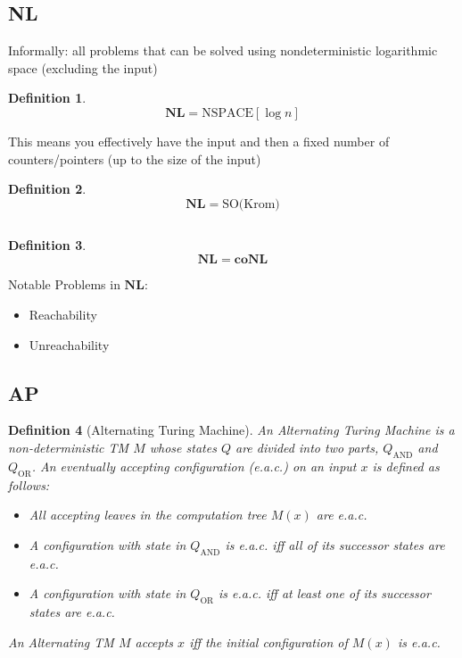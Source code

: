 \documentclass[]{article}
\theoremstyle{break}
\theoremstyle{break}
\newtheorem{definition}{Definition}[section]
\begin{document}
\subsection{NL}
\label{sec:NL}
Informally: all problems that can be solved using nondeterministic logarithmic space (excluding the input)
\\
\begin{definition}
	$$\mathbf{NL} = \hyperref[sec:NSPACE]{\text{NSPACE}[\log n]}$$
\end{definition}
$ $
\\
This means you effectively have the input and then a fixed number of counters/pointers (up to the size of the input)
\\
\begin{definition}
	$$\mathbf{NL} = \text{SO(Krom)}$$
\end{definition}
$ $
\\
\begin{definition}
	$$\mathbf{NL} = \mathbf{coNL}$$
\end{definition}
$ $
\\
Notable Problems in $\mathbf{NL}$:
\begin{itemize}
	\item Reachability
	\item Unreachability
\end{itemize}

\subsection{AP} \label{sec:AP}

\begin{definition}[Alternating Turing Machine]
	An Alternating Turing Machine is a non-deterministic TM $M$ whose states $Q$ are divided into two parts, $Q_{\text{AND}}$ and $Q_{\text{OR}}$. An eventually accepting configuration (e.a.c.) on an input $x$ is defined as follows:
	
	\begin{itemize}
		\item All accepting leaves in the computation tree $M(x)$ are e.a.c.
		\item A configuration with state in $Q_{\text{AND}}$ is e.a.c. iff all of its successor states are e.a.c.
		\item A configuration with state in $Q_{\text{OR}}$ is e.a.c. iff at least one of its successor states are e.a.c.
	\end{itemize}
	
	An Alternating TM $M$ accepts $x$ iff the initial configuration of $M(x)$ is e.a.c.
\end{definition}
\end{document}
